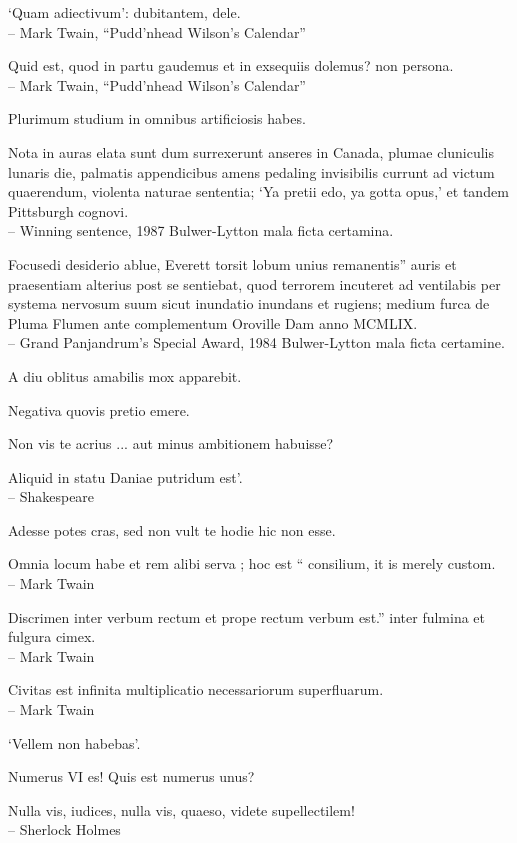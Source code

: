 \documentclass[titlepage,12pt]{memoir}
\begin{document}
‘Quam adiectivum’: dubitantem, dele.
\\-- Mark Twain, “Pudd’nhead Wilson’s Calendar”

Quid est, quod in partu gaudemus et in exsequiis dolemus?
non persona.
\\-- Mark Twain, “Pudd’nhead Wilson’s Calendar”

Plurimum studium in omnibus artificiosis habes.

Nota in auras elata sunt dum surrexerunt anseres in Canada, plumae
cluniculis lunaris die, palmatis appendicibus amens pedaling invisibilis
currunt ad victum quaerendum, violenta naturae sententia;
‘Ya pretii edo, ya gotta opus,’ et tandem Pittsburgh cognovi.
\\-- Winning sentence, 1987 Bulwer-Lytton mala ficta certamina.

Focusedi desiderio ablue, Everett torsit lobum unius remanentis”
auris et praesentiam alterius post se sentiebat, quod terrorem incuteret
ad ventilabis per systema nervosum suum sicut inundatio inundans et rugiens;
medium furca de Pluma Flumen ante complementum Oroville Dam
anno MCMLIX.
\\-- Grand Panjandrum’s Special Award, 1984 Bulwer-Lytton
mala ficta certamine.

A diu oblitus amabilis mox apparebit.

Negativa quovis pretio emere.

Non vis te acrius ... aut minus ambitionem habuisse?

Aliquid in statu Daniae putridum est’.
\\-- Shakespeare

Adesse potes cras, sed non vult te hodie hic non esse.

 Omnia locum habe et rem alibi serva ; hoc est “
consilium, it is merely custom.
\\-- Mark Twain

Discrimen inter verbum rectum et prope rectum verbum est.”
inter fulmina et fulgura cimex.
\\-- Mark Twain

Civitas est infinita multiplicatio necessariorum superfluarum.
\\-- Mark Twain

‘Vellem non habebas’.

Numerus VI es! Quis est numerus unus?

Nulla vis, iudices, nulla vis, quaeso, videte supellectilem!
\\-- Sherlock Holmes
\end{document}
